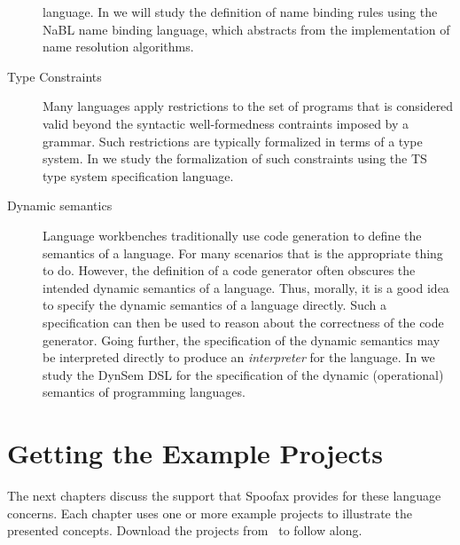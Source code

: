 \begin{description}
language. In  we will study the definition of name binding rules
using the NaBL name binding language, which abstracts from the implementation of
name resolution algorithms.
\item[Type Constraints] Many languages apply restrictions to the set of programs
that is considered valid beyond the syntactic well-formedness contraints imposed
by a grammar. Such restrictions are typically formalized in terms of a type
system. In  we study the formalization of such constraints using
the TS type system specification language. 
\item[Dynamic semantics] Language workbenches traditionally use code generation
to define the semantics of a language. For many scenarios that is the
appropriate thing to do. However, the definition of a code generator often
obscures the intended dynamic semantics of a language. Thus, morally, it is a
good idea to specify the dynamic semantics of a language directly. Such a
specification can then be used to reason about the correctness of the code
generator. Going further, the specification of the dynamic semantics may be
interpreted directly to produce an \emph{interpreter} for the language. In
 we study the DynSem DSL for the specification of the dynamic
(operational) semantics of programming languages.
\end{description}

\section{Getting the Example Projects}

The next chapters discuss the support that Spoofax provides for these
language concerns. Each chapter uses one or more example projects to illustrate
the presented concepts. Download the projects from \LanguagesRepo\ to follow along.
